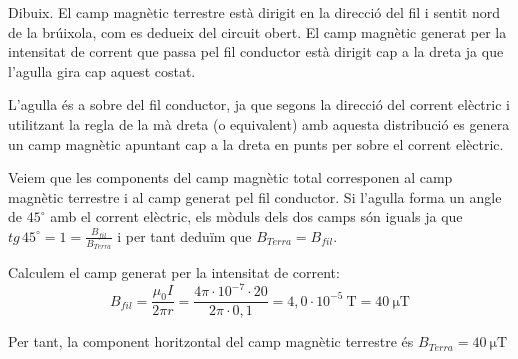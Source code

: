 \begin{solapartat}
 Dibuix. El camp magnètic terrestre està dirigit en la direcció del fil i sentit nord de la brúixola, com es dedueix del circuit obert. El camp magnètic generat per la intensitat de corrent que passa pel fil conductor està dirigit cap a la dreta ja que l'agulla gira cap aquest costat.

 L'agulla és a sobre del fil conductor, ja que segons la direcció del corrent elèctric i utilitzant la regla de la mà dreta (o equivalent) amb aquesta distribució es genera un camp magnètic apuntant cap a la dreta en punts per sobre el corrent elèctric.
\end{solapartat}

\begin{solapartat}
 Veiem que les components del camp magnètic total corresponen al camp magnètic terrestre i al camp generat pel fil conductor. Si l'agulla forma un angle de $45^\circ$ amb el corrent elèctric, els mòduls dels dos camps són iguals ja que $tg\,45^\circ = 1 = \frac{B_{fil}}{B_{Terra}}$ i per tant deduïm que $B_{Terra} = B_{fil}$.

 Calculem el camp generat per la intensitat de corrent:
\[ B_{fil} = \frac{\mu_0 I}{2\pi r} = \frac{4\pi\cdot 10^{-7}\cdot 20}{2\pi\cdot 0,1} = 4,0\cdot 10^{-5}\ \mathrm{T} = 40\ \mathrm{\mu T} \]

 Per tant, la component horitzontal del camp magnètic terrestre és $B_{Terra} = 40\ \mathrm{\mu T}$
\end{solapartat}

